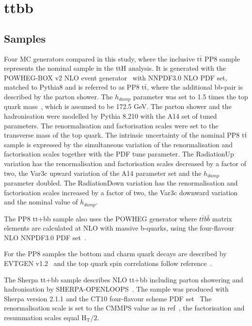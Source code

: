 \section{ttbb}
\label{sec:ttbb}

\subsection{Samples}
Four MC generators compared in this study, where the inclusive $\mathrm{t\bar{t}}$ PP8 sample represents the nominal sample in the ttH analysis. It is generated with the POWHEG-BOX v2 NLO event generator~\cite{Nason:2004rx,Frixione:2007vw,Alioli:2010xd,Campbell:2014kua} with NNPDF3.0 NLO PDF set, matched to Pythia8 and is referred to as PP8 $\mathrm{t\bar{t}}$, where the additional bb-pair is described by the parton shower. The $h_{damp}$ parameter was set to 1.5 times the top quark mass~\cite{ATL-PHYS-PUB-2016-020}, which is assumed to be 172.5 GeV. The parton shower and the hadronisation were modelled by Pythia 8.210 with the A14 set of tuned parameters. The renormalisation and factorisation scales were set to the transverse mass of the top quark.
The intrinsic uncertainty of the nominal PP8 $\mathrm{t\bar{t}}$ sample is expressed by the simultaneous variation of the renormalisation and factorisation scales together with the PDF tune parameter. The RadiationUp variation has the renormalisation and factorisation scales decreased by a factor of two, the Var3c upward variation of the A14 parameter set and the $h_{damp}$ parameter doubled. The RadiationDown variation has the renormalisation and factorisation scales increased by a factor of two, the Var3c downward variation and the nominal value of $h_{damp}$.

The PP8 tt+bb sample also uses the POWHEG generator where $t\bar{t}b\bar{b}$ matrix elements are calculated at NLO with massive b-quarks, using the four-flavour NLO NNPDF3.0 PDF set~\cite{Jezo:2018yaf}.

For the PP8 samples the bottom and charm quark decays are described by EVTGEN v1.2~\cite{LANGE2001152} and the top quark spin correlations follow reference~\cite{Frixione:2007zp}.

The Sherpa tt+bb sample describes NLO tt+bb including parton showering and hadronisation by SHERPA-OPENLOOPS~\cite{Cascioli:2013era,Gleisberg:2008ta,Cascioli:2011va}. The sample was produced with Sherpa version 2.1.1 and the CT10 four-flavour scheme PDF set~\cite{Guzzi:2011sv,Gao:2013xoa} The renormalisation scale is set to the CMMPS value as in ref~\cite{Cascioli:2013era}, the factorisation and resummation scales equal $\mathrm{H_T/2}$.

